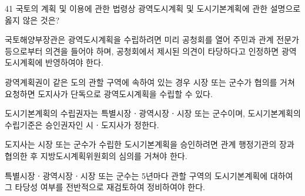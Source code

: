 \begin{question}{41}
국토의 계획 및 이용에 관한 법령상 광역도시계획 및 도시기본계획에 관한 설명으로 옳지 않은 것은?
\begin{choices}
  \item 국토해양부장관은 광역도시계획을 수립하려면 미리 공청회를 열어 주민과 관계 전문가 등으로부터 의견을 들어야 하며, 공청회에서 제시된 의견이 타당하다고 인정하면 광역도시계획에 반영하여야 한다.
  \item 광역계획권이 같은 도의 관할 구역에 속하여 있는 경우 시장 또는 군수가 협의를 거쳐 요청하면 도지사가 단독으로 광역도시계획을 수립할 수 있다.
  \item 도시기본계획의 수립권자는 특별시장ㆍ광역시장ㆍ시장 또는 군수이며, 도시기본계획의 수립기준은 승인권자인 시ㆍ도지사가 정한다.
  \item 도지사는 시장 또는 군수가 수립한 도시기본계획을 승인하려면 관계 행정기관의 장과 협의한 후 지방도시계획위원회의 심의를 거쳐야 한다.
  \item 특별시장ㆍ광역시장ㆍ시장 또는 군수는 5년마다 관할 구역의 도시기본계획에 대하여 그 타당성 여부를 전반적으로 재검토하여 정비하여야 한다.
\end{choices}
\end{question}
